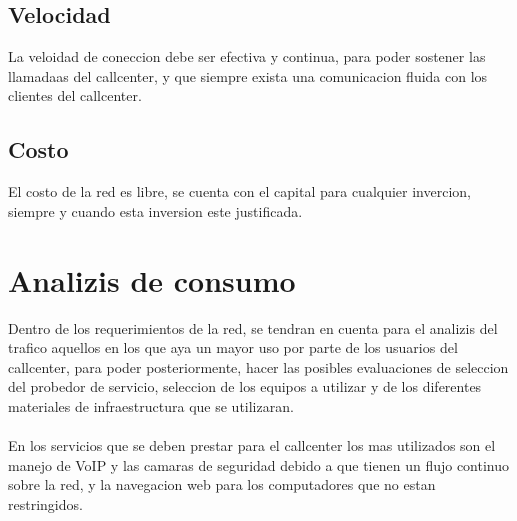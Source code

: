 \documentclass[12pt]{article}
\begin{document}
\subsection{\textbf{Velocidad}}
La veloidad de coneccion debe ser efectiva y continua, para poder sostener las llamadaas del callcenter, y que siempre exista una comunicacion fluida con los clientes del callcenter.

\subsection{\textbf{Costo}}
El costo de la red es libre, se cuenta con el capital para cualquier invercion, siempre y cuando esta inversion este justificada.

\pagebreak
\section{\textbf{Analizis de consumo}}
Dentro de los requerimientos de la red, se tendran en cuenta para el analizis del trafico aquellos en los que aya un mayor uso por parte de los usuarios del callcenter, para poder posteriormente, hacer las posibles evaluaciones de seleccion del probedor de servicio, seleccion de los equipos a utilizar y de los diferentes materiales de infraestructura que se utilizaran.\\\\ 
En los servicios que se deben prestar para el callcenter los mas utilizados son el manejo de VoIP y las camaras de seguridad debido a que tienen un flujo continuo sobre la red, y la navegacion web para los computadores que no estan restringidos.\\\\
\end{document}

